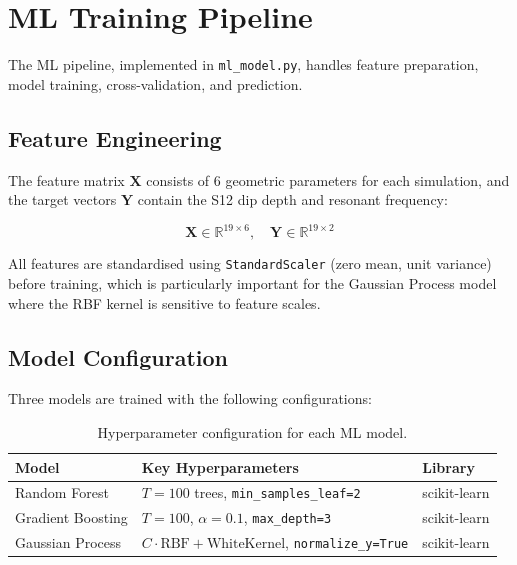 \documentclass[12pt,a4paper]{report}
\begin{document}
\section{ML Training Pipeline}
\label{sec:ml_pipeline}

The ML pipeline, implemented in \texttt{ml\_model.py}, handles feature preparation, model training, cross-validation, and prediction.

\subsection{Feature Engineering}

The feature matrix $\mathbf{X}$ consists of 6 geometric parameters for each simulation, and the target vectors $\mathbf{Y}$ contain the S12 dip depth and resonant frequency:

\begin{equation}
    \mathbf{X} \in \mathbb{R}^{19 \times 6}, \quad \mathbf{Y} \in \mathbb{R}^{19 \times 2}
\end{equation}

All features are standardised using \texttt{StandardScaler} (zero mean, unit variance) before training, which is particularly important for the Gaussian Process model where the RBF kernel is sensitive to feature scales.

\subsection{Model Configuration}

Three models are trained with the following configurations:

\begin{table}[H]
    \centering
    \caption{Hyperparameter configuration for each ML model.}
    \label{tab:hyperparams}
    \begin{tabular}{lll}
        \toprule
        Model & Key Hyperparameters & Library \\
        \midrule
        Random Forest & $T = 100$ trees, \texttt{min\_samples\_leaf=2} & scikit-learn \\
        Gradient Boosting & $T = 100$, $\alpha = 0.1$, \texttt{max\_depth=3} & scikit-learn \\
        Gaussian Process & $C \cdot \text{RBF} + \text{WhiteKernel}$, \texttt{normalize\_y=True} & scikit-learn \\
        \bottomrule
    \end{tabular}
\end{table}
\end{document}
